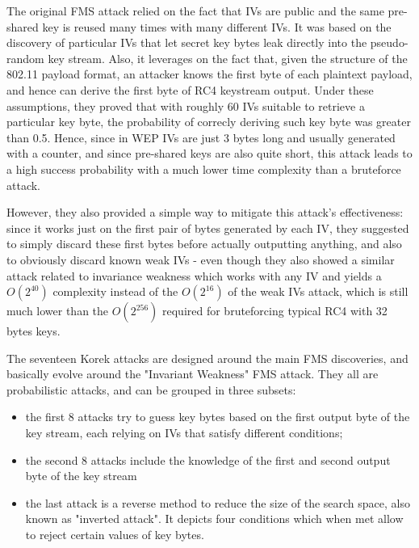 \documentclass[a4paper,12pt,titlepage]{article}
\begin{document}
The original FMS attack relied on the fact that IVs are public and the same
pre-shared key is reused many times with many different IVs. It was based on
the discovery of particular IVs that let secret key bytes leak directly into
the pseudo-random key stream. Also, it leverages on the fact that, given the
structure of the 802.11 payload format, an attacker knows the first byte of
each plaintext payload, and hence can derive the first byte of RC4 keystream
output. Under these assumptions, they proved that with roughly 60 IVs suitable
to retrieve a particular key byte, the probability of correcly deriving such
key byte was greater than 0.5. Hence, since in WEP IVs are just 3 bytes long and
usually generated with a counter, and since pre-shared keys are also quite short, 
this attack leads to a high success probability with a much lower time complexity
than a bruteforce attack.

However, they also provided a simple way to mitigate this attack's
effectiveness: since it works just on the first pair of bytes generated by each
IV, they suggested to simply discard these first bytes before actually
outputting anything, and also to obviously discard known weak IVs - even though
they also showed a similar attack related to invariance weakness which works
with any IV and yields a $O(2^{40})$ complexity instead of the 
$O(2^{16})$ of the weak IVs attack, which is still much lower than
the $O(2^{256})$ required for bruteforcing typical RC4 with 32 bytes
keys.

The seventeen Korek attacks are designed around the main FMS discoveries, and
basically evolve around the "Invariant Weakness" FMS attack. They all are
probabilistic attacks, and can be grouped in three subsets:

\begin{itemize}
	\item the first 8 attacks try to guess key bytes based on the first output byte of
  the key stream, each relying on IVs that satisfy different conditions;
	\item the second 8 attacks include the knowledge of the first and second output 
  byte of the key stream
	\item the last attack is a reverse method to reduce the size of the search space,
  also known as "inverted attack". It depicts four conditions which when met
  allow to reject certain values of key bytes.
\end{itemize}
\end{document}
